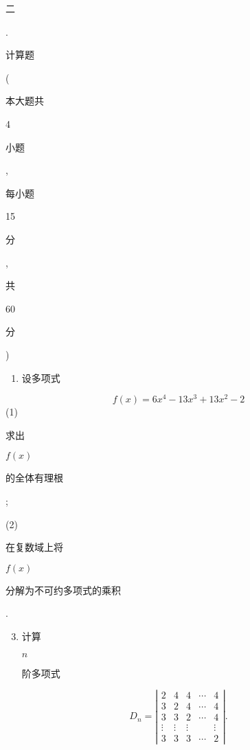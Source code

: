 \documentclass[10pt]{article}
\begin{document}
\begin{CJK}{UTF8}{mj}二\end{CJK}. \begin{CJK}{UTF8}{mj}计算题\end{CJK} (\begin{CJK}{UTF8}{mj}本大题共\end{CJK} 4 \begin{CJK}{UTF8}{mj}小题\end{CJK}, \begin{CJK}{UTF8}{mj}每小题\end{CJK} 15 \begin{CJK}{UTF8}{mj}分\end{CJK}, \begin{CJK}{UTF8}{mj}共\end{CJK} 60 \begin{CJK}{UTF8}{mj}分\end{CJK})

\begin{enumerate}
  \item \begin{CJK}{UTF8}{mj}设多项式\end{CJK}
\end{enumerate}
$$
f(x)=6 x^{4}-13 x^{3}+13 x^{2}-2
$$
(1) \begin{CJK}{UTF8}{mj}求出\end{CJK} $f(x)$ \begin{CJK}{UTF8}{mj}的全体有理根\end{CJK};

(2) \begin{CJK}{UTF8}{mj}在复数域上将\end{CJK} $f(x)$ \begin{CJK}{UTF8}{mj}分解为不可约多项式的乘积\end{CJK}.

\begin{enumerate}
  \setcounter{enumi}{2}
  \item \begin{CJK}{UTF8}{mj}计算\end{CJK} $n$ \begin{CJK}{UTF8}{mj}阶多项式\end{CJK}
\end{enumerate}
$$
D_{n}=\left|\begin{array}{ccccc}
2 & 4 & 4 & \cdots & 4 \\
3 & 2 & 4 & \cdots & 4 \\
3 & 3 & 2 & \cdots & 4 \\
\vdots & \vdots & \vdots & & \vdots \\
3 & 3 & 3 & \cdots & 2
\end{array}\right| .
$$
\end{document}
